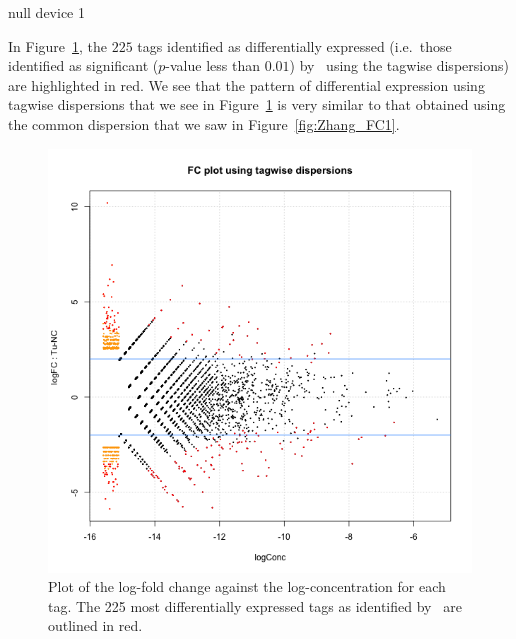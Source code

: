 \begin{Schunk}
\begin{Soutput}
null device 
          1 
\end{Soutput}
\end{Schunk}

In Figure~\ref{fig:Zhang_FC2}, the $225$ tags identified as
differentially expressed (i.e.~those identified as significant
($p$-value less than $0.01$) by \edgeR~using the tagwise dispersions)
are highlighted in red. We see that the pattern of differential
expression using tagwise dispersions that we see in
Figure~\ref{fig:Zhang_FC2} is very similar to that obtained using the
common dispersion that we saw in Figure~\ref{fig:Zhang_FC1}.

\begin{figure}[ht]
\begin{center}
\includegraphics[height=0.45\textheight]{edgeR_case_study_Zhang-028.png}
\caption{Plot of the log-fold change against the log-concentration for
  each tag. The 225 most differentially expressed tags as identified
  by \edgeR~are outlined in red.}
\label{fig:Zhang_FC2}
\end{center}
\end{figure}

